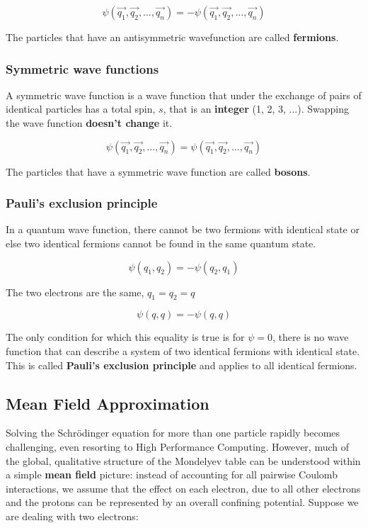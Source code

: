 		$$\psi(\vec{q_1},\vec{q_2}, \dots, \vec{q_n})=-\psi(\vec{q_1},\vec{q_2}, \dots, \vec{q_n})$$

		The particles that have an antisymmetric wavefunction are called \textbf{fermions}.

		\subsubsection{Symmetric wave functions}
		A symmetric wave function is a wave function that under the exchange of pairs of identical particles has a total spin, $s$, that is an \textbf{integer} (1, 2, 3, ...).
		Swapping the wave function \textbf{doesn't change} it.

		$$\psi(\vec{q_1},\vec{q_2}, \dots, \vec{q_n})=\psi(\vec{q_1},\vec{q_2}, \dots, \vec{q_n})$$

		The particles that have a symmetric wave function are called \textbf{bosons}.

		\subsubsection{Pauli's exclusion principle}
		In a quantum wave function, there cannot be two fermions with identical state or else two identical fermions cannot be found in the same quantum state.

		$$\psi(q_1, q_2)= -\psi(q_2,q_1)$$

		The two electrons are the same, $q_1=q_2=q$

		$$\psi(q,q)=-\psi(q,q)$$

		The only condition for which this equality is true is for  $\psi = 0$, there is no wave function that can describe a system of two identical fermions with identical state.
		This is called \textbf{Pauli's exclusion principle} and applies to all identical fermions.
	\subsection{Mean Field Approximation}
	Solving the Schr\"odinger equation for more than one particle rapidly becomes challenging, even resorting to High Performance Computing.
	However, much of the global, qualitative structure of the Mondelyev table can be understood within a simple \textbf{mean field} picture: instead of accounting for all pairwise Coulomb interactions, we assume that the effect on each electron, due to all other electrons and the protons can be represented by an overall confining potential.
	Suppose we are dealing with two electrons:

